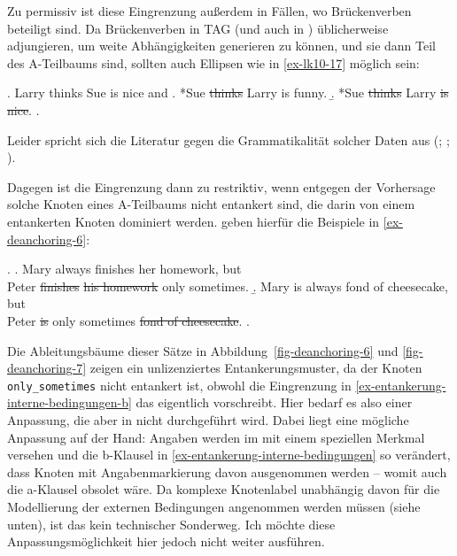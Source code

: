 Zu permissiv ist diese Eingrenzung  au\ss erdem in Fällen, wo Brückenverben beteiligt sind. Da  Brückenverben in TAG (und auch in ) üblicherweise adjungieren, um weite Abhängigkeiten generieren zu können, und sie dann Teil des A-Teilbaums sind, sollten auch Ellipsen wie in \ref{ex-lk10-17} möglich sein:    

\ex. Larry thinks Sue is nice and \label{ex-lk10-17}
\a. *Sue \sout{thinks} Larry is funny.
\b. *Sue \sout{thinks} Larry \sout{is nice}.
\z. \citep[(17)]{Lichte:Kallmeyer:10}

Leider spricht sich die Literatur gegen die Grammatikalität solcher Daten aus (\citealt[198]{Sag:76}; \citealt[18]{Johnson:04}; \citealt[1149]{Osborne:08}). 

Dagegen ist die Eingrenzung dann zu restriktiv, wenn entgegen der Vorhersage solche Knoten eines A-Teilbaums nicht entankert sind, die darin von einem entankerten Knoten dominiert werden. \cite{Lichte:Kallmeyer:10} geben hierfür die Beispiele in \ref{ex-deanchoring-6}:   

\ex. \label{ex-deanchoring-6}
\a. Mary always finishes her homework, but \\
Peter \sout{finishes}  \sout{his homework} only sometimes. \label{ex-deanchoring-6-a}
\b. Mary is always fond of cheesecake, but \\
Peter \sout{is} only sometimes \sout{fond of cheesecake}. \label{ex-deanchoring-6-b}
\z. \citep[(14),(15)]{Lichte:Kallmeyer:10}

Die Ableitungsbäume dieser Sätze in Abbildung~\ref{fig-deanchoring-6} und \ref{fig-deanchoring-7} zeigen ein unlizenziertes Ent\-ankerungsmuster, da der Knoten {\tt only\_sometimes} nicht entankert ist, obwohl die Eingrenzung in \ref{ex-entankerung-interne-bedingungen-b} das eigentlich vorschreibt. Hier bedarf es also einer Anpassung, die aber in \cite{Lichte:Kallmeyer:10} nicht durchgeführt wird. Dabei liegt eine mögliche Anpassung auf der Hand: Angaben werden im  mit einem speziellen Merkmal versehen und die b-Klausel in \ref{ex-entankerung-interne-bedingungen} so verändert, dass Knoten mit Angabenmarkierung davon ausgenommen werden -- womit auch die a-Klausel obsolet wäre. Da komplexe Knotenlabel unabhängig davon für die Modellierung der externen Bedingungen  angenommen werden müssen (siehe unten), ist das kein technischer Sonderweg. Ich möchte diese Anpassungsmöglichkeit hier jedoch nicht weiter ausführen.

